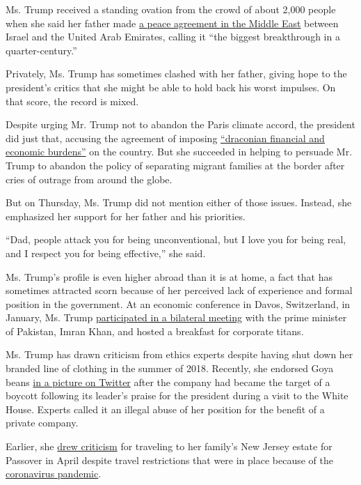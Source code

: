 Ms. Trump received a standing ovation from the crowd of about 2,000
people when she said her father made
\href{https://www.nytimes3xbfgragh.onion/2020/08/15/world/middleeast/israel-uae-netanyahu-arabs.html}{a
peace agreement in the Middle East} between Israel and the United Arab
Emirates, calling it ``the biggest breakthrough in a quarter-century.''

Privately, Ms. Trump has sometimes clashed with her father, giving hope
to the president's critics that she might be able to hold back his worst
impulses. On that score, the record is mixed.

Despite urging Mr. Trump not to abandon the Paris climate accord, the
president did just that, accusing the agreement of imposing
\href{https://www.whitehouse.gov/briefings-statements/statement-president-trump-paris-climate-accord/}{``draconian
financial and economic burdens''} on the country. But she succeeded in
helping to persuade Mr. Trump to abandon the policy of separating
migrant families at the border after cries of outrage from around the
globe.

But on Thursday, Ms. Trump did not mention either of those issues.
Instead, she emphasized her support for her father and his priorities.

``Dad, people attack you for being unconventional, but I love you for
being real, and I respect you for being effective,'' she said.

Ms. Trump's profile is even higher abroad than it is at home, a fact
that has sometimes attracted scorn because of her perceived lack of
experience and formal position in the government. At an economic
conference in Davos, Switzerland, in January, Ms. Trump
\href{https://www.nytimes3xbfgragh.onion/2020/01/22/world/europe/ivanka-trump-davos.html}{participated
in a bilateral meeting} with the prime minister of Pakistan, Imran Khan,
and hosted a breakfast for corporate titans.

Ms. Trump has drawn criticism from ethics experts despite having shut
down her branded line of clothing in the summer of 2018. Recently, she
endorsed Goya beans
\href{https://twitter.com/IvankaTrump/status/1283221019684110337}{in a
picture on Twitter} after the company had became the target of a boycott
following its leader's praise for the president during a visit to the
White House. Experts called it an illegal abuse of her position for the
benefit of a private company.

Earlier, she
\href{https://www.nytimes3xbfgragh.onion/2020/04/15/us/politics/coronavirus-ivanka-trump.html}{drew
criticism} for traveling to her family's New Jersey estate for Passover
in April despite travel restrictions that were in place because of the
\href{https://www.nytimes3xbfgragh.onion/news-event/coronavirus}{coronavirus
pandemic}.

